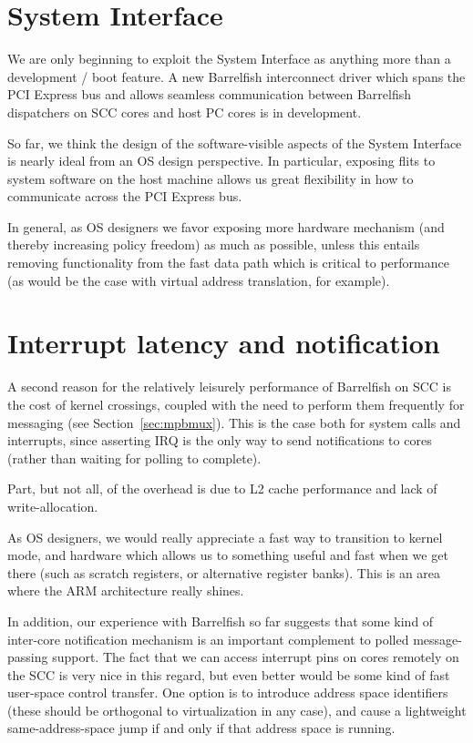\documentclass[a4paper,twoside]{report} %
\begin{document}
\section{System Interface}

We are only beginning to exploit the System Interface as anything 
more than a development / boot feature.  A new Barrelfish interconnect
driver which spans the PCI Express bus and allows seamless communication
between Barrelfish dispatchers on SCC cores and host PC cores is in
development. 

So far, we think the design of the software-visible aspects of the
System Interface is nearly ideal from an OS design perspective.
In particular, exposing flits to system software on the host machine
allows us great  flexibility in how to communicate across the PCI
Express bus. 

In general, as OS designers we favor exposing more hardware mechanism (and
thereby increasing policy freedom) as much as possible, unless this
entails removing functionality from the fast data path which is
critical to performance (as would be the case with virtual address
translation, for example). 

\section{Interrupt latency and notification}

A second reason for the relatively leisurely performance of Barrelfish
on SCC is the cost of kernel crossings, coupled with the need to
perform them frequently for messaging (see Section~\ref{sec:mpbmux}).
This is the case both for system calls and interrupts, since asserting
IRQ is the only way to send notifications to cores (rather than
waiting for polling to complete). 

Part, but not all, of the overhead is due to L2 cache performance and
lack of write-allocation.  

As OS designers, we would really appreciate a fast way to transition
to kernel mode, and hardware which allows us to something useful and
fast when we get there (such as scratch registers, or alternative
register banks).  This is an area where the ARM architecture really
shines. 

In addition, our experience with Barrelfish so far suggests that some
kind of inter-core notification mechanism is an important complement
to polled message-passing support.  The fact that we can access
interrupt pins on cores remotely on the SCC is very nice in this
regard, but even better would be some kind of fast user-space control
transfer.  One option is to introduce address space identifiers (these
should be orthogonal to virtualization in any case), and cause a
lightweight same-address-space jump if and only if that address space
is running. 

 

\end{document}
